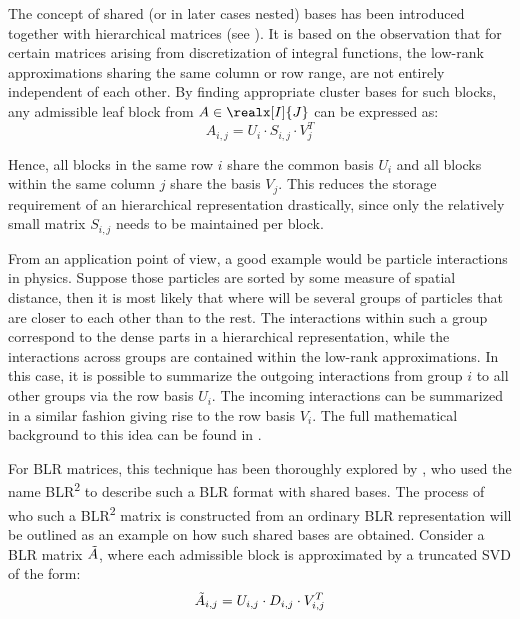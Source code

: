 The concept of shared (or in later cases nested) bases has been introduced together with hierarchical matrices (see \cite{hackbusch_hierarchical_2004}). It is based on the observation that for certain matrices arising from discretization of integral functions, the low-rank approximations sharing the same column or row range, are not entirely independent of each other. By finding appropriate cluster bases for such blocks, any admissible leaf block from $A \in \realx[I]{J}$ can be expressed as:
\begin{equation}
    A_{i,j}=U_i\cdot S_{i,j}\cdot V_j^T
\end{equation}

\noindent Hence, all blocks in the same row $i$ share the common basis $U_i$ and all blocks within the same column $j$ share the basis $V_j$. This reduces the storage requirement of an hierarchical representation drastically, since only the relatively small matrix $S_{i,j}$ needs to be maintained per block.

From an application point of view, a good example would be particle interactions in physics. Suppose those particles are sorted by some measure of spatial distance, then it is most likely that where will be several groups of particles that are closer to each other than to the rest. The interactions within such a group correspond to the dense parts in a hierarchical representation, while the interactions across groups are contained within the low-rank approximations. In this case, it is possible to summarize the outgoing interactions from group $i$ to all other groups via the row basis $U_i$. The incoming interactions can be summarized in a similar fashion giving rise to the row basis $V_i$. The full mathematical background to this idea can be found in \cite{hackbusch_h2-matrix_2002}.

For BLR matrices, this technique has been thoroughly explored by \cite{ashcraft_block_2020}, who used the 
name BLR\textsuperscript{2} to describe such a BLR format with shared bases. The process of who such a BLR\textsuperscript{2} matrix is constructed from an ordinary BLR representation will be outlined as an example on how such shared bases are obtained. Consider a BLR matrix $\Tilde{A}$, where each admissible block is approximated by a truncated SVD of the form:
\begin{equation}
    \Tilde{A}_{i,j} = U_{i,j}\cdot D_{i,j}\cdot V_{i,j}^T
\end{equation}

